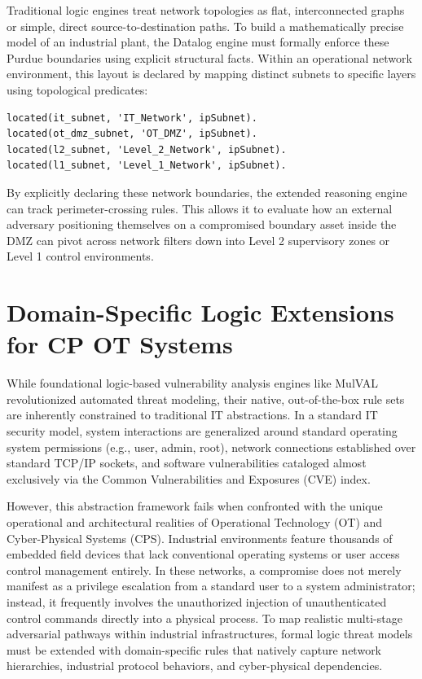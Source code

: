 \documentclass[target=mst,aauheader=aics,style=]{thud}
\begin{document}
Traditional logic engines treat network topologies as flat, interconnected graphs or simple, direct source-to-destination paths. To build a mathematically precise model of an industrial plant, the Datalog engine must formally enforce these Purdue boundaries using explicit structural facts. Within an operational network environment, this layout is declared by mapping distinct subnets to specific layers using topological predicates:
\begin{verbatim}
located(it_subnet, 'IT_Network', ipSubnet).
located(ot_dmz_subnet, 'OT_DMZ', ipSubnet).
located(l2_subnet, 'Level_2_Network', ipSubnet).
located(l1_subnet, 'Level_1_Network', ipSubnet).
\end{verbatim}

By explicitly declaring these network boundaries, the extended reasoning engine can track perimeter-crossing rules. This allows it to evaluate how an external adversary positioning themselves on a compromised boundary asset inside the DMZ can pivot across network filters down into Level 2 supervisory zones or Level 1 control environments. 

\section{Domain-Specific Logic Extensions for CP OT Systems}
While foundational logic-based vulnerability analysis engines like MulVAL revolutionized automated threat modeling, their native, out-of-the-box rule sets are inherently constrained to traditional IT abstractions. In a standard IT security model, system interactions are generalized around standard operating system permissions (e.g., user, admin, root), network connections established over standard TCP/IP sockets, and software vulnerabilities cataloged almost exclusively via the Common Vulnerabilities and Exposures (CVE) index.

However, this abstraction framework fails when confronted with the unique operational and architectural realities of Operational Technology (OT) and Cyber-Physical Systems (CPS). Industrial environments feature thousands of embedded field devices that lack conventional operating systems or user access control management entirely. In these networks, a compromise does not merely manifest as a privilege escalation from a standard user to a system administrator; instead, it frequently involves the unauthorized injection of unauthenticated control commands directly into a physical process. To map realistic multi-stage adversarial pathways within industrial infrastructures, formal logic threat models must be extended with domain-specific rules that natively capture network hierarchies, industrial protocol behaviors, and cyber-physical dependencies.
\end{document}
